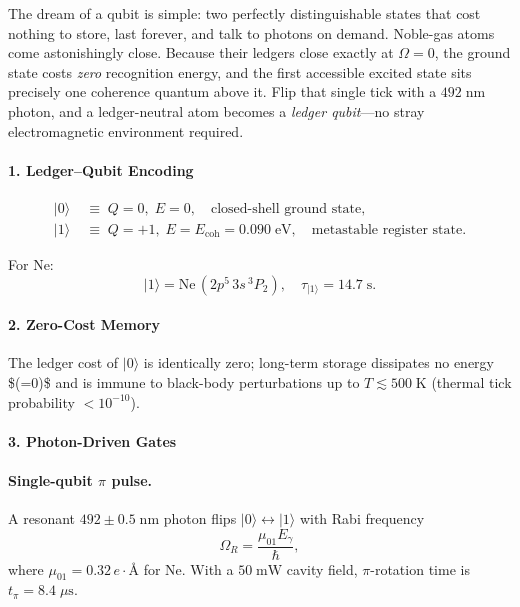 \documentclass[11pt,oneside]{book}
\begin{document}
The dream of a qubit is simple: two perfectly distinguishable states that
cost nothing to store, last forever, and talk to photons on demand.
Noble-gas atoms come astonishingly close.
Because their ledgers close exactly at \(\Omega=0\), the ground state
costs \emph{zero} recognition energy, and the first accessible excited
state sits precisely one coherence quantum above it.
Flip that single tick with a \(492\;\text{nm}\) photon, and a
ledger-neutral atom becomes a \emph{ledger qubit}—no stray
electromagnetic environment required.

\paragraph*{1. Ledger–Qubit Encoding}

\[
\begin{aligned}
|0\rangle &\;\equiv\;
   Q = 0,\;
   E = 0, \quad
   \text{closed-shell ground state}, \\[4pt]
|1\rangle &\;\equiv\;
   Q = +1,\;
   E = E_{\text{coh}}=0.090\;\text{eV}, \quad
   \text{metastable register state}.
\end{aligned}
\]

For \(\mathrm{Ne}\):
\[
|1\rangle = \mathrm{Ne}\,(2p^5\,3s\,^3P_2),
\quad
\tau_{|1\rangle}=14.7\;\text{s}.
\]

\paragraph*{2. Zero-Cost Memory}

The ledger cost of \(|0\rangle\) is identically zero;  
long-term storage dissipates no energy \$\!(=0)\$ and is immune to
black-body perturbations up to \(T\lesssim500\;\text{K}\)
(thermal tick probability \(<10^{-10}\)).

\paragraph*{3. Photon-Driven Gates}

\paragraph{Single-qubit \(\pi\) pulse.}
A resonant \(492\pm0.5\;\text{nm}\) photon flips
\(|0\rangle \leftrightarrow |1\rangle\) with Rabi frequency
\[
\Omega_R = \frac{\mu_{01}E_\gamma}{\hbar},
\]
where \(\mu_{01}=0.32\,e\!\cdot\!\text{Å}\) for Ne.
With a \(50\;\text{mW}\) cavity field,
\(\pi\)-rotation time is \(t_{\pi}=8.4\;\mu\text{s}\).
\end{document}
